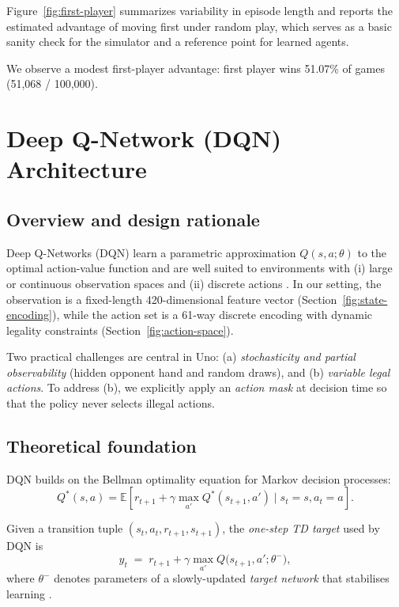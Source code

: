 \documentclass[11pt]{article}
\begin{document}
Figure~\ref{fig:first-player} summarizes variability in episode length and reports the estimated advantage of moving first under random play, which serves as a basic sanity check for the simulator and a reference point for learned agents.

We observe a modest first-player advantage: first player wins 51.07\% of games (51{,}068 / 100{,}000).

\section{Deep Q-Network (DQN) Architecture}
\subsection{Overview and design rationale}
Deep Q-Networks (DQN) learn a parametric approximation $Q(s,a;\theta)$ to the optimal action-value function and are well suited to environments with (i) large or continuous observation spaces and (ii) discrete actions \parencite{mnih2015human}. In our setting, the observation is a fixed-length 420-dimensional feature vector (Section~\ref{fig:state-encoding}), while the action set is a 61-way discrete encoding with dynamic legality constraints (Section~\ref{fig:action-space}).

Two practical challenges are central in Uno: (a) \emph{stochasticity and partial observability} (hidden opponent hand and random draws), and (b) \emph{variable legal actions}. To address (b), we explicitly apply an \emph{action mask} at decision time so that the policy never selects illegal actions.

\subsection{Theoretical foundation}
DQN builds on the Bellman optimality equation for Markov decision processes:
\begin{equation}
Q^*(s,a)=\mathbb{E}\left[r_{t+1}+\gamma \max_{a'} Q^*(s_{t+1},a')\mid s_t=s, a_t=a\right].
\end{equation}

Given a transition tuple $(s_t,a_t,r_{t+1},s_{t+1})$, the \emph{one-step TD target} used by DQN is
\begin{equation}
  y_t \;=\; r_{t+1} + \gamma\max_{a'} Q\bigl(s_{t+1},a';\theta^{-}\bigr),
\end{equation}
where $\theta^{-}$ denotes parameters of a slowly-updated \emph{target network} that stabilises learning \parencite{mnih2015human}.
\end{document}
